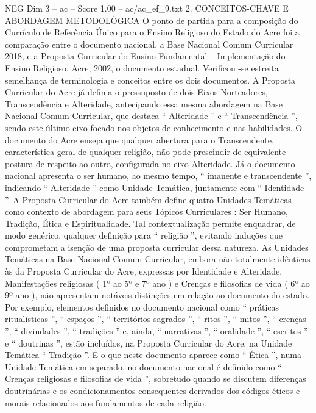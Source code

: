 \begin{textsample}{NEG Dim 3 – ac – Score 1.00 – ac/ac\_ef\_9.txt}  \label{ex:f3_neg_261}
2.
CONCEITOS-CHAVE E ABORDAGEM METODOLÓGICA O ponto de partida para a composição do Currículo de Referência Único para o Ensino Religioso do Estado do Acre foi a comparação entre o documento nacional, a Base Nacional Comum Curricular 2018, e a Proposta Curricular do Ensino Fundamental – Implementação do Ensino Religioso, Acre, 2002, o documento estadual.
Verificou -se estreita semelhança de terminologia e conceitos entre os dois documentos.
A Proposta Curricular do Acre já definia o pressuposto de dois Eixos Norteadores, Transcendência e Alteridade, antecipando essa mesma abordagem na Base Nacional Comum Curricular, que destaca “ Alteridade ” e “ Transcendência ”, sendo este último eixo focado nos objetos de conhecimento e nas habilidades.
O documento do Acre enseja que qualquer abertura para o Transcendente, característica geral de qualquer religião, não pode prescindir de equivalente postura de respeito ao outro, configurada no eixo Alteridade.
Já o documento nacional apresenta o ser humano, ao mesmo tempo, “ imanente e transcendente ”, indicando “ Alteridade ” como Unidade Temática, juntamente com “ Identidade ”.
A Proposta Curricular do Acre também define quatro Unidades Temáticas como contexto de abordagem para seus Tópicos Curriculares : Ser Humano, Tradição, Ética e Espiritualidade.
Tal contextualização permite enquadrar, de modo genérico, qualquer definição para “ religião ”, evitando induções que comprometam a isenção de uma proposta curricular dessa natureza.
As Unidades Temáticas na Base Nacional Comum Curricular, embora não totalmente idênticas às da Proposta Curricular do Acre, expressas por Identidade e Alteridade, Manifestações religiosas ( 1º ao 5º e 7º ano ) e Crenças e filosofias de vida ( 6º ao 9º ano ), não apresentam notáveis distinções em relação ao documento do estado.
Por exemplo, elementos definidos no documento nacional como “ práticas ritualísticas ”, “ espaços ”, “ territórios sagrados ”, “ ritos ”, “ mitos ”, “ crenças ”, “ divindades ”, “ tradições ” e, ainda, “ narrativas ”, “ oralidade ”, “ escritos ” e “ doutrinas ”, estão incluídos, na Proposta Curricular do Acre, na Unidade Temática “ Tradição ”.
E o que neste documento aparece como “ Ética ”, numa Unidade Temática em separado, no documento nacional é definido como “ Crenças religiosas e filosofias de vida ”, sobretudo quando se discutem diferenças doutrinárias e os condicionamentos consequentes derivados dos códigos éticos e morais relacionados aos fundamentos de cada religião.

\end{textsample}
